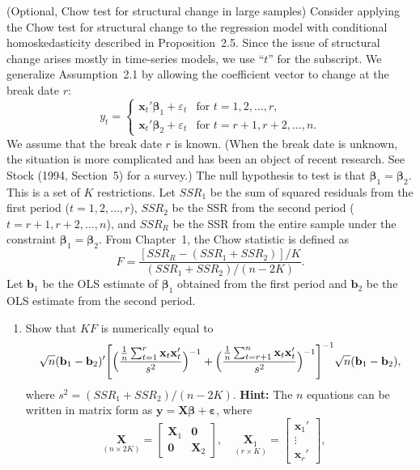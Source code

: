 \begin{problemset}
\exercise[12] (Optional, Chow test for structural change in large samples)\quad
Consider applying the Chow test for structural change to the regression model with conditional
homoskedasticity described in Proposition~2.5. Since the issue of structural
change arises mostly in time-series models, we use ``$t$'' for the subscript. We
generalize Assumption~2.1 by allowing the coefficient vector to change at the
break date $r$:
\[
y_t = \begin{cases}
\mathbf{x}_t'\bm{\beta}_1 + \varepsilon_t & \text{for } t = 1, 2, \ldots, r, \\
\mathbf{x}_t'\bm{\beta}_2 + \varepsilon_t & \text{for } t = r+1, r+2, \ldots, n.
\end{cases}
\]
We assume that the break date $r$ is known. (When the break date is unknown,
the situation is more complicated and has been an object of recent research.
See Stock (1994, Section~5) for a survey.) The null hypothesis to test is that
$\bm{\beta}_1 = \bm{\beta}_2$. This is a set of $K$ restrictions. Let $SSR_1$ be the sum of squared
residuals from the first period ($t = 1, 2, \ldots, r$), $SSR_2$ be the SSR from the
second period ($t = r+1, r+2, \ldots, n$), and $SSR_R$ be the SSR from the entire
sample under the constraint $\bm{\beta}_1 = \bm{\beta}_2$. From Chapter~1, the Chow statistic is
defined as
\[
F = \frac{[SSR_R - (SSR_1 + SSR_2)]/K}
{(SSR_1 + SSR_2)/(n - 2K)}.
\]
Let $\mathbf{b}_1$ be the OLS estimate of $\bm{\beta}_1$ obtained from the first period and
$\mathbf{b}_2$ be the OLS estimate from the second period.
\begin{enumerate}[label=(\alph*)]
\item Show that $KF$ is numerically equal to
\[
\sqrt{n}(\mathbf{b}_1 - \mathbf{b}_2)'\!
\left[\Bigl(\frac{\frac{1}{n}\sum_{t=1}^{r}\mathbf{x}_t\mathbf{x}_t'}{s^2}\Bigr)^{-1}
+ \Bigl(\frac{\frac{1}{n}\sum_{t=r+1}^{n}\mathbf{x}_t\mathbf{x}_t'}{s^2}\Bigr)^{-1}
\right]^{-1}\!\sqrt{n}(\mathbf{b}_1 - \mathbf{b}_2),
\]
where $s^2 = (SSR_1 + SSR_2)/(n - 2K)$. \textbf{Hint:} The $n$ equations can be written
in matrix form as $\mathbf{y} = \mathbf{X}\bm{\beta} + \bm{\varepsilon}$, where
\[
\underset{(n\times 2K)}{\mathbf{X}}
= \begin{bmatrix} \mathbf{X}_1 & \mathbf{0} \\ \mathbf{0} & \mathbf{X}_2 \end{bmatrix}, \quad
\underset{(r\times K)}{\mathbf{X}_1}
= \begin{bmatrix} \mathbf{x}_1' \\ \vdots \\ \mathbf{x}_r' \end{bmatrix}, \quad
\]
\end{enumerate}
\end{problemset}
